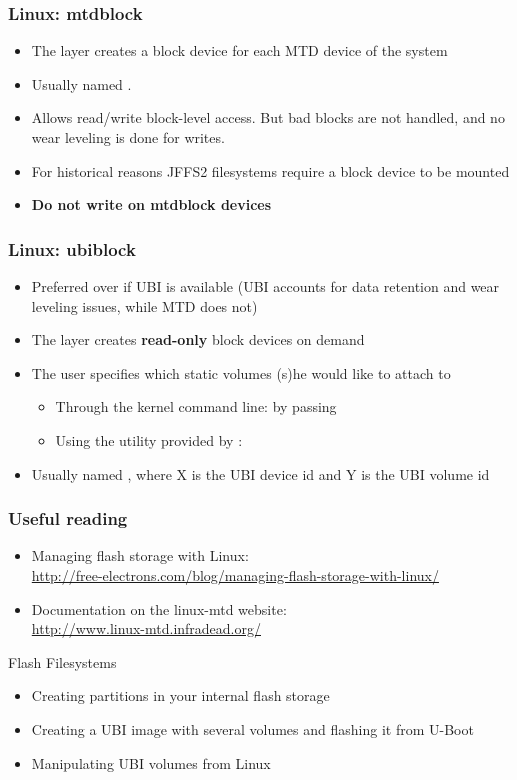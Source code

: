 \begin{frame}
  \frametitle{Linux: mtdblock}
  \begin{itemize}
  \item The  layer creates a block device for each MTD
    device of the system
  \item Usually named .
  \item Allows read/write block-level access. But bad blocks are not
    handled, and no wear leveling is done for writes.
  \item For historical reasons JFFS2 filesystems require a block device
    to be mounted
  \item {\bf Do not write on mtdblock devices}
  \end{itemize}
\end{frame}

\begin{frame}
  \frametitle{Linux: ubiblock}
  \begin{itemize}
  \item Preferred over  if UBI is available (UBI accounts
    for data retention and wear leveling issues, while MTD does not)
  \item The  layer creates {\bf read-only} block devices
    on demand
  \item The user specifies which static volumes (s)he would like to attach
    to 
    \begin{itemize}
    \item Through the kernel command line: by passing
    \item Using the  utility provided by :
    \end{itemize}

   \item Usually named , where X is the UBI device
     id and Y is the UBI volume id
  \end{itemize}
\end{frame}

\begin{frame}
  \frametitle{Useful reading}
  \begin{itemize}
  \item Managing flash storage with Linux:\\
    \url{http://free-electrons.com/blog/managing-flash-storage-with-linux/}
  \item Documentation on the linux-mtd website:\\
    \url{http://www.linux-mtd.infradead.org/}
  \end{itemize}
\end{frame}

\setuplabframe
{Flash Filesystems}
{
  \begin{itemize}
  \item Creating partitions in your internal flash storage
  \item Creating a UBI image with several volumes and flashing it from
    U-Boot
  \item Manipulating UBI volumes from Linux
  \end{itemize}
}
